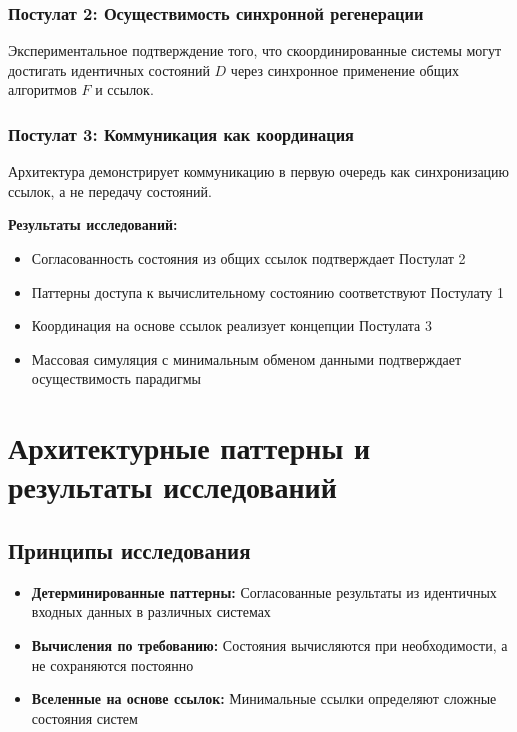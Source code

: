 \documentclass[14pt, a4paper]{extarticle}
\begin{document}
\subsubsection{Постулат 2: Осуществимость синхронной регенерации}
Экспериментальное подтверждение того, что скоординированные системы могут достигать идентичных состояний $D$ через синхронное применение общих алгоритмов $F$ и ссылок.

\subsubsection{Постулат 3: Коммуникация как координация}
Архитектура демонстрирует коммуникацию в первую очередь как синхронизацию ссылок, а не передачу состояний.

\textbf{Результаты исследований:}
\begin{itemize}
    \item Согласованность состояния из общих ссылок подтверждает Постулат 2
    \item Паттерны доступа к вычислительному состоянию соответствуют Постулату 1
    \item Координация на основе ссылок реализует концепции Постулата 3
    \item Массовая симуляция с минимальным обменом данными подтверждает осуществимость парадигмы
\end{itemize}

\section{Архитектурные паттерны и результаты исследований}

\subsection{Принципы исследования}
\begin{itemize}
    \item \textbf{Детерминированные паттерны:} Согласованные результаты из идентичных входных данных в различных системах
    \item \textbf{Вычисления по требованию:} Состояния вычисляются при необходимости, а не сохраняются постоянно
    \item \textbf{Вселенные на основе ссылок:} Минимальные ссылки определяют сложные состояния систем
\end{itemize}
\end{document}
